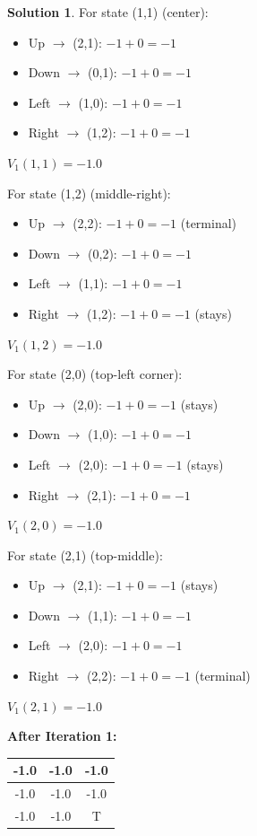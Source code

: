 \documentclass[11pt]{article}
\theoremstyle{definition}
\newtheorem*{solution}{Solution}
\begin{document}
\begin{solution}
For state (1,1) (center):
\begin{itemize}
    \item Up $\to$ (2,1): $-1 + 0 = -1$
    \item Down $\to$ (0,1): $-1 + 0 = -1$
    \item Left $\to$ (1,0): $-1 + 0 = -1$
    \item Right $\to$ (1,2): $-1 + 0 = -1$
\end{itemize}
$V_1(1,1) = -1.0$

For state (1,2) (middle-right):
\begin{itemize}
    \item Up $\to$ (2,2): $-1 + 0 = -1$ (terminal)
    \item Down $\to$ (0,2): $-1 + 0 = -1$
    \item Left $\to$ (1,1): $-1 + 0 = -1$
    \item Right $\to$ (1,2): $-1 + 0 = -1$ (stays)
\end{itemize}
$V_1(1,2) = -1.0$

For state (2,0) (top-left corner):
\begin{itemize}
    \item Up $\to$ (2,0): $-1 + 0 = -1$ (stays)
    \item Down $\to$ (1,0): $-1 + 0 = -1$
    \item Left $\to$ (2,0): $-1 + 0 = -1$ (stays)
    \item Right $\to$ (2,1): $-1 + 0 = -1$
\end{itemize}
$V_1(2,0) = -1.0$

For state (2,1) (top-middle):
\begin{itemize}
    \item Up $\to$ (2,1): $-1 + 0 = -1$ (stays)
    \item Down $\to$ (1,1): $-1 + 0 = -1$
    \item Left $\to$ (2,0): $-1 + 0 = -1$
    \item Right $\to$ (2,2): $-1 + 0 = -1$ (terminal)
\end{itemize}
$V_1(2,1) = -1.0$

\begin{center}
\textbf{After Iteration 1:}
\begin{tabular}{|c|c|c|}
\hline
-1.0 & -1.0 & -1.0 \\
\hline
-1.0 & -1.0 & -1.0 \\
\hline
-1.0 & -1.0 & T \\
\hline
\end{tabular}
\end{center}


\end{solution}
\end{document}
